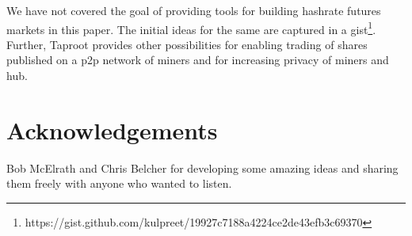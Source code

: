 \documentclass{article}
\begin{document}
We have not covered the goal of providing tools for building hashrate
futures markets in this paper. The initial ideas for the same are
captured in a
gist\footnote{https://gist.github.com/kulpreet/19927c7188a4224ce2de43efb3c69370}. Further,
Taproot provides other possibilities for enabling trading of shares
published on a p2p network of miners and for increasing privacy of
miners and hub.






\section{Acknowledgements}

Bob McElrath and Chris Belcher for developing some amazing ideas and
sharing them freely with anyone who wanted to listen.

 

\end{document}
